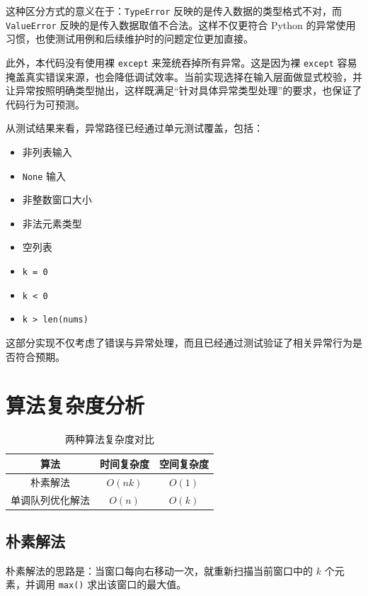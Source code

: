 \documentclass[a4paper,UTF8,fontset=none]{ctexart}
\begin{document}
这种区分方式的意义在于：\texttt{TypeError} 反映的是传入数据的类型格式不对，而 \texttt{ValueError} 反映的是传入数据取值不合法。这样不仅更符合 Python 的异常使用习惯，也使测试用例和后续维护时的问题定位更加直接。

此外，本代码没有使用裸 \texttt{except} 来笼统吞掉所有异常。这是因为裸 \texttt{except} 容易掩盖真实错误来源，也会降低调试效率。当前实现选择在输入层面做显式校验，并让异常按照明确类型抛出，这样既满足“针对具体异常类型处理”的要求，也保证了代码行为可预测。

从测试结果来看，异常路径已经通过单元测试覆盖，包括：

\begin{itemize}
    \item 非列表输入
    \item \texttt{None} 输入
    \item 非整数窗口大小
    \item 非法元素类型
    \item 空列表
    \item \texttt{k = 0}
    \item \texttt{k < 0}
    \item \texttt{k > len(nums)}
\end{itemize}

这部分实现不仅考虑了错误与异常处理，而且已经通过测试验证了相关异常行为是否符合预期。

\section{算法复杂度分析}

\begin{table}[H]
    \centering
    \begin{tabular}{ccc}
    \toprule
    算法 & 时间复杂度 & 空间复杂度 \\
    \midrule
    朴素解法 & $O(nk)$ & $O(1)$ \\
    单调队列优化解法 & $O(n)$ & $O(k)$ \\
    \bottomrule
    \end{tabular}
    \caption{两种算法复杂度对比}
\end{table}

\subsection{朴素解法}

朴素解法的思路是：当窗口每向右移动一次，就重新扫描当前窗口中的 $k$ 个元素，并调用 \texttt{max()} 求出该窗口的最大值。
\end{document}
